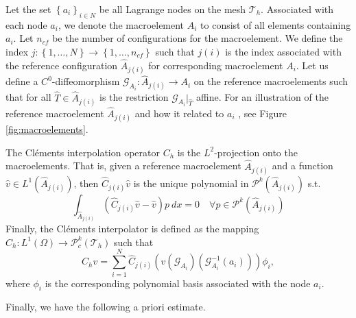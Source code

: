 \documentclass[11pt]{article}
\theoremstyle{remark}
\renewcommand{\le}{\leqslant}
\numberwithin{equation}{section}
\begin{document}
 Let the set  $\left\{ a_{i}\right\}_{i\in N}$ be all Lagrange nodes on the mesh $\mathcal{T}_{h}$. Associated with each node $a_{i}$, we denote the macroelement $A_{i}$ to consist of all elements containing $a_{i}$. Let $n_{cf}$ be the number of configurations for the macroelement. We define the index $j:
\left\{ 1,\ldots,N \right\} \to \left\{ 1, \ldots, n_{cf} \right\}  $ such that $j( i) $ is the index associated with the reference configuration $\widehat{A}_{j(i) }$ for corresponding macroelement $A_{i}$.
Let us define a $C^{0}$-diffeomorphism $\mathcal{G}_{A_{i}}:
\widehat{A}_{j( i) } \to A_{i}$ on the reference macroelements such that for all $\hat{T} \in \widehat{A}_{j( i) } $ is the restriction $\mathcal{G} _{A_{i}}|_{ \hat{T} }$ affine. For an illustration of the reference
macroelement $\widehat{A}_{j( i) }$ and how it related to $a_{i}$ , see
Figure \ref{fig:macroelements}.

The Cléments interpolation operator $C_{h}$ is the $L^2$-projection onto the macroelements. That is, given
a reference macroelement $\widehat{A}_{j( i) }$ and a function $\hat{v} \in L^{1}( \widehat{A}_{j( i) })  $, then $\widehat{C}_{j( i) } \hat{v}$  is the unique polynomial in $\mathcal{P}^{k} ( \widehat{A}_{j( i) })  $ s.t. \[
\int_{  \widehat{A}_{j( i) }}^{} ( \widehat{C}_{j( i) } \hat{v} - \hat{v}) p \ dx  = 0 \quad  \forall p \in \mathcal{P}^{k} ( \widehat{A}_{j( i) })
\]
Finally, the Cléments interpolator is defined as the mapping $C_{h} : L^{1}( \Omega )  \to \mathcal{P} ^{k}_{c}(\mathcal{T}_{h}   ) $ such that
\[
C_{h} v = \sum_{i=1}^{N} \widehat{C}_{j( i) } ( v (\mathcal{G} _{A_{i}}) (\mathcal{G}^{-1}_{A_{i}}(a_{i})) )\phi _{i},
\]
where $\phi _{i}$ is the corresponding polynomial basis associated with the node $a_{i}$.



Finally, we have the following a priori estimate.
\end{document}

